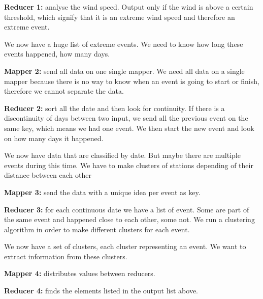 \textbf{Reducer 1:} analyse the wind speed. Output only if the wind is above a certain threshold, which signify that it is an extreme wind speed and therefore an extreme event.

We now have a huge list of extreme events. We need to know how long these events happened, how many days.

\textbf{Mapper 2:} send all data on one single mapper. We need all data on a single mapper because there is no way to know when an event is going to start or finish, therefore we cannot separate the data.



\textbf{Reducer 2:} sort all the date and then look for continuity. If there is a discontinuity of days between two input, we send all the previous event on the same key, which means we had one event. We then start the new event and look on how many days it happened.



We now have data that are classified by date. But maybe there are multiple events during this time. We have to make clusters of stations depending of their distance between each other



\textbf{Mapper 3:} send the data with a unique idea per event as key.



\textbf{Reducer 3:} for each continuous date we have a list of event. Some are part of the same event and happened close to each other, some not. We run a clustering algorithm in order to make different clusters for each event.



We now have a set of clusters, each cluster representing an event. We want to extract information from these clusters.



\textbf{Mapper 4:} distributes values between reducers.



\textbf{Reducer 4:} finds the elements listed in the output list above.
